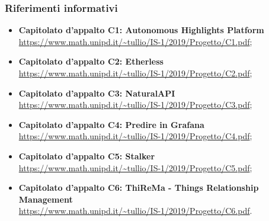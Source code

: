 	\subsubsection{Riferimenti informativi}
	\begin{itemize}
		\item \textbf{Capitolato d'appalto C1: Autonomous Highlights Platform} \\ 			\url{https://www.math.unipd.it/~tullio/IS-1/2019/Progetto/C1.pdf};
		
		\item \textbf{Capitolato d'appalto C2: Etherless} \\ 			\url{https://www.math.unipd.it/~tullio/IS-1/2019/Progetto/C2.pdf};
		
		\item \textbf{Capitolato d'appalto C3: 	NaturalAPI} \\ 			\url{https://www.math.unipd.it/~tullio/IS-1/2019/Progetto/C3.pdf};
		
		\item \textbf{Capitolato d'appalto C4: Predire in Grafana} \\ 			\url{https://www.math.unipd.it/~tullio/IS-1/2019/Progetto/C4.pdf};
		
		\item \textbf{Capitolato d'appalto C5: Stalker} \\ 			\url{https://www.math.unipd.it/~tullio/IS-1/2019/Progetto/C5.pdf};
		
		\item \textbf{Capitolato d'appalto C6: ThiReMa - Things Relationship Management} \\ 			\url{https://www.math.unipd.it/~tullio/IS-1/2019/Progetto/C6.pdf}.
			
	\end{itemize}